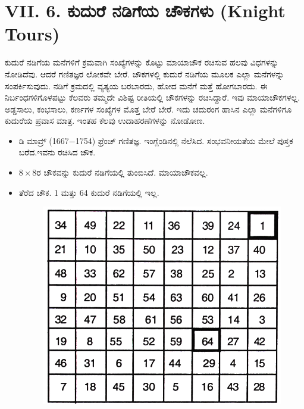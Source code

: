 \section*{VII. 6. ಕುದುರೆ ನಡಿಗೆಯ ಚೌಕಗಳು (Knight Tours)}

ಕುದುರೆ ನಡಿಗೆಯ ಮನೆಗಳಿಗೆ ಕ್ರಮವಾಗಿ ಸಂಖ್ಯೆಗಳನ್ನು ಕೊಟ್ಟು ಮಾಯಾಚೌಕ ರಚಿಸುವ ಹಲವು ವಿಧಗಳನ್ನು ನೋಡಿದೆವು. ಆದರೆ ಗಣಿತಜ್ಞರ ಲೋಕವೇ ಬೇರೆ. ಚೌಕಗಳಲ್ಲಿ ಕುದುರೆ ನಡಿಗೆಯ ಮೂಲಕ ಎಲ್ಲಾ ಮನೆಗಳನ್ನು ಸಂಪರ್ಕಿಸುವುದು. ನಡಿಗೆ ಕ್ರಮದಲ್ಲಿ ವ್ಯತ್ಯಯ ಬರಬಾರದು, ಹೋದ ಮನೆಗೆ ಮತ್ತೆ ಹೋಗಬಾರದು. ಈ ನಿರ್ಬಂಧಗಳಿಗೊಳಪಟ್ಟು ಕೆಲವರು ತಮ್ಮದೇ ವಿಶಿಷ್ಟ ರೀತಿಯಲ್ಲಿ ಚೌಕಗಳನ್ನು ರಚಿಸಿದ್ದಾರೆ. ಇವು ಮಾಯಾಚೌಕಗಳಲ್ಲ. ಅಡ್ಡಸಾಲು, ಕಂಭಸಾಲು, ಕರ್ಣಗಳ ಸಂಖ್ಯೆಗಳ ಮೊತ್ತ ಬೇರೆ ಬೇರೆ. ಇದು ಚದುರಂಗ ಹಾಸಿನ ಎಲ್ಲಾ ಮನೆಗಳಿಗೂ ಕುದುರೆಯ ಪ್ರವಾಸ ಮಾತ್ರ. ಇಂತಹ ಕೆಲವು ಉದಾಹರಣೆಗಳನ್ನು \break ನೋಡೋಣ.

\begin{itemize}
	\item ಡಿ ಮಾವ್ರ್ (1667$-$1754) ಫ್ರೆಂಚ್ ಗಣಿತಜ್ಞ. ಇಂಗ್ಲೆಂಡಿನಲ್ಲಿ ನೆಲೆಸಿದ. ಸಂಭವ\-ನೀಯತೆಯ ಮೇಲೆ ಪುಸ್ತಕ ಬರೆದ.ಇವನು ರಚಿಸಿದ ಚೌಕ.
	\item $8 \times 8$ರ ಚೌಕವನ್ನು ಕುದುರೆ ನಡಿಗೆಯಲ್ಲಿ ತುಂಬಿಸಿದೆ. ಮಾಯಾಚೌಕವಲ್ಲ.
	\item ತೆರೆದ ಚೌಕ. 1 ಮತ್ತು 64 ಕುದುರೆ ನಡಿಗೆಯಲ್ಲಿ ಇಲ್ಲ.
	\begin{figure}[H]
	\includegraphics[scale=.9]{src/figures/chap6/fig6-8.jpg}
	\end{figure}


\end{itemize}
